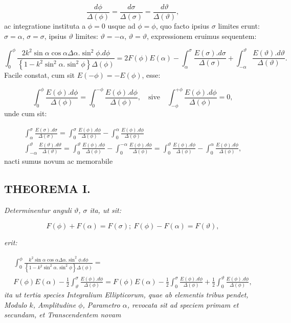 \documentclass{article}
\begin{document}
\[
\frac{d\phi}{\Delta(\phi)}=\frac{d\sigma}{\Delta(\sigma)}=\frac{d\vartheta}{\Delta(\vartheta)},
\]
ac integratione instituta a $\phi=0$ usque ad $\phi=\phi$, quo facto ipsius $\sigma$ limites erunt: $\sigma=\alpha$, $\sigma=\sigma$, ipsius $\vartheta$ limites: $\vartheta=-\alpha$, $\vartheta=\vartheta$, expressionem eruimus sequentem:

\[
\int_{0}^{\phi}\frac{2k^{2}\sin\alpha\cos\alpha\Delta\alpha.\sin^{2}\phi.d\phi}{\left\{1-k^{2}\sin^{2}\alpha.\sin^{2}\phi\right\}\Delta(\phi)}=2F(\phi)E(\alpha)-\int_{\alpha}^{\sigma}\frac{E(\sigma).d\sigma}{\Delta(\sigma)}+\int_{-\alpha}^{\vartheta}\frac{E(\vartheta).d\vartheta}{\Delta(\vartheta)}.
\]
Facile constat, cum sit $E(-\phi)=-E(\phi)$, esse:

\[
\int_{0}^{\phi}\frac{E(\phi).d\phi}{\Delta(\phi)}=\int_{0}^{-\phi}\frac{E(\phi).d\phi}{\Delta(\phi)},\quad\text{sive}\quad\int_{-\phi}^{+\phi}\frac{E(\phi).d\phi}{\Delta(\phi)}=0,
\]
unde cum sit:

\[
\begin{gathered}
\int_{\alpha}^{\sigma}\frac{E(\sigma).d\sigma}{\Delta(\sigma)}=\int_{0}^{\sigma}\frac{E(\phi).d\phi}{\Delta(\phi)}-\int_{0}^{\alpha}\frac{E(\phi).d\phi}{\Delta(\phi)}\\[1.5ex]
\int_{-\alpha}^{\vartheta}\frac{E(\vartheta).d\vartheta}{\Delta(\vartheta)}=\int_{0}^{\vartheta}\frac{E(\phi).d\phi}{\Delta(\phi)}-\int_{0}^{-\alpha}\frac{E(\phi).d\phi}{\Delta(\phi)}=\int_{0}^{\vartheta}\frac{E(\phi).d\phi}{\Delta(\phi)}-\int_{0}^{\alpha}\frac{E(\phi).d\phi}{\Delta(\phi)},
\end{gathered}
\]
nacti sumus novum ac memorabile

\subsection*{THEOREMA I.}

\emph{Determinentur anguli $\vartheta$, $\sigma$ ita, ut sit:}

\[
F(\phi)+F(\alpha)=F(\sigma);\ F(\phi)-F(\alpha)=F(\vartheta),
\]

\emph{erit:}

\[
\begin{gathered}
\int_{0}^{\phi}\frac{k^{2}\sin\alpha\cos\alpha\Delta\alpha.\sin^{2}\phi.d\phi}{\left\{1-k^{2}\sin^{2}\alpha.\sin^{2}\phi\right\}\Delta(\phi)}=\\[1.5ex]
F(\phi)E(\alpha)-\frac{1}{2}\int_{\vartheta}^{\sigma}\frac{E(\phi).d\phi}{\Delta(\phi)}=F(\phi)E(\alpha)-\frac{1}{2}\int_{0}^{\sigma}\frac{E(\phi).d\phi}{\Delta(\phi)}+\frac{1}{2}\int_{0}^{\vartheta}\frac{E(\phi).d\phi}{\Delta(\phi)},
\end{gathered}
\]
\emph{ita ut tertia species Integralium Ellipticorum, quae ab elementis tribus pendet, Modulo $k$, Amplitudine $\phi$, Parametro $\alpha$, revocata sit ad speciem primam et secundam, et Transcendentem novam}
\end{document}
